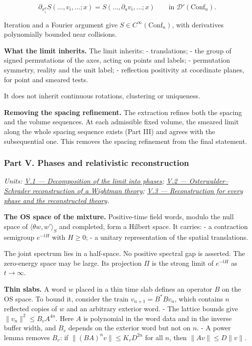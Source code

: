 \documentclass[
  letterpaper,
  11pt]{article}
\begin{document}
\[\partial_{x_i^a}S(\dots,v_i,\dots;x)=S(\dots,\partial_av_i,\dots;x)\qquad\text{in }\mathcal D'(\mathrm{Conf}_n).\]

Iteration and a Fourier argument give
\(S\in C^\infty(\mathrm{Conf}_n)\), with derivatives polynomially
bounded near collisions.

\textbf{What the limit inherits.} The limit inherits: - translations; -
the group of signed permutations of the axes, acting on points and
labels; - permutation symmetry, reality and the unit label; - reflection
positivity at coordinate planes, for point and smeared tests.

It does not inherit continuous rotations, clustering or uniqueness.

\textbf{Removing the spacing refinement.} The extraction refines both
the spacing and the volume sequences. At each admissible fixed volume,
the smeared limit along the whole spacing sequence exists (Part III) and
agrees with the subsequential one. This removes the spacing refinement
from the final statement.

\subsubsection{Part V. Phases and relativistic
reconstruction}\label{part-v.-phases-and-relativistic-reconstruction}

\emph{Units:
\href{https://github.com/scottnarmstrong/yang-mills-informalization/blob/main/outline/units/V-1.md}{V.1
--- Decomposition of the limit into phases};
\href{https://github.com/scottnarmstrong/yang-mills-informalization/blob/main/outline/units/V-2.md}{V.2
--- Osterwalder--Schrader reconstruction of a Wightman theory};
\href{https://github.com/scottnarmstrong/yang-mills-informalization/blob/main/outline/units/V-3.md}{V.3
--- Reconstruction for every phase and the reconstructed theory}.}

\textbf{The OS space of the mixture.} Positive-time field words, modulo
the null space of \(\langle\theta w,w'\rangle_S\) and completed, form a
Hilbert space. It carries: - a contraction semigroup \(e^{-tH}\) with
\(H\ge0\); - a unitary representation of the spatial translations.

The joint spectrum lies in a half-space. No positive spectral gap is
asserted. The zero-energy space may be large. Its projection \(\Pi\) is
the strong limit of \(e^{-tH}\) as \(t\to\infty\).

\textbf{Thin slabs.} A word \(w\) placed in a thin time slab defines an
operator \(B\) on the OS space. To bound it, consider the train
\(v_{n+1}=B^\ast Bv_n\), which contains \(n\) reflected copies of \(w\)
and an arbitrary exterior word. - The lattice bounds give
\(\lVert v_n\rVert^2\le B_vA^{4n}\). Here \(A\) is polynomial in the
word data and in the inverse buffer width, and \(B_v\) depends on the
exterior word but not on \(n\). - A power lemma removes \(B_v\): if
\(\lVert(BA)^nv\rVert\le K_vD^{2n}\) for all \(n\), then
\(\lVert Av\rVert\le D\lVert v\rVert\).
\end{document}
